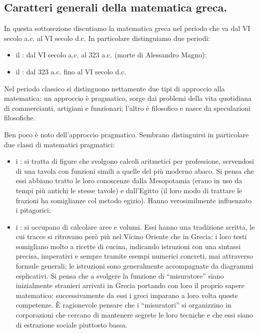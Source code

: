 \subsection{Caratteri generali della matematica greca.}\label{CaratteriGeneraliDellaMatematicaGreca}
\par In questa sottosezione discutiamo la matematica greca nel periodo che va dal VI secolo a.c. al VI secolo d.c. In particolare distinguiamo due periodi:
\begin{itemize}
	\item il : dal VI secolo a.c. al 323 a.c. (morte di Alessandro Magno):
	\item il : dal 323 a.c. fino al VI secolo d.c.
\end{itemize}
\par Nel periodo classico si distinguono nettamente due tipi di approccio alla matematica: un approccio \`e pragmatico, sorge dai problemi della vita quotidiana di commercianti, artigiani e funzionari; l'altro \`e filosofico e nasce da speculazioni filosofiche.
\par Ben poco \`e noto dell'approccio pragmatico. Sembrano distinguirsi in particolare due classi di matematici pragmatici:
\begin{itemize}
	\item i : si tratta di figure che svolgono calcoli aritmetici per professione, servendosi di una tavola con funzioni simili a quelle del pi\`u moderno abaco. Si pensa che essi abbiano tratto le loro conoscenze dalla Mesopotamia (erano in uso da tempi pi\`u antichi le stesse tavole) e dall'Egitto (il loro modo di trattare le frazioni ha somiglianze col metodo egizio). Hanno verosimilmente influenzato i pitagorici;
	\item i : si occupano di calcolare aree e volumi. Essi hanno una tradizione scritta, le cui tracce si ritrovano per\`o pi\`u nel Vicino Oriente che in Grecia: i loro testi somigliano molto a ricette di cucina, indicando istruzioni con una sintassi precisa, imperativi e sempre tramite esempi numerici concreti, mai attraverso formule generali; le istruzioni sono generalmente accompagnate da diagrammi esplicativi. Si pensa che a svolgere la funzione di ``misuratore'' siano inizialmente stranieri arrivati in Grecia portando con loro il proprio sapere matematico: successivamente da essi i greci imparano a loro volta queste competenze. \`E ragionevole pensare che i ``misuratori'' si organizzino in corporazioni che cercano di mantenere segrete le loro tecniche e che essi siano di estrazione sociale piuttosto bassa.
\end{itemize}
